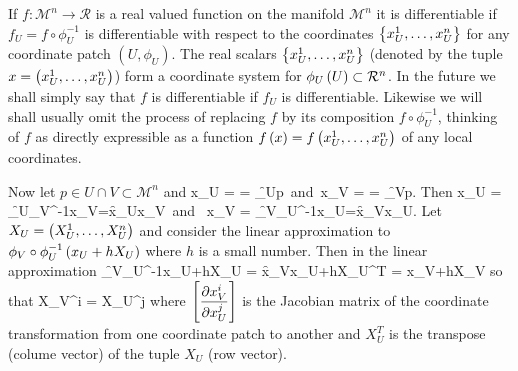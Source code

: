 If $f:\mathcal{M}^{n}\rightarrow\mathcal{R}$ is a real valued function on the manifold $\mathcal{M}^{n}$ it is differentiable if $f_{U} = f\circ\phi_{U}^{-1}$
is differentiable with respect to the coordinates $\left \{ {x^{1}_{U},\dots, x^{n}_{U}} \right \}$ for any coordinate patch $(U,\phi_{U})$.  The real scalars 
$\left \{ {x^{1}_{U},\dots, x^{n}_{U}} \right \}$
(denoted by the tuple $x=\left ( {x^{1}_{U},\dots,x^{n}_{U}} \right )$) form a coordinate system for ${\phi_{U}}\left ( {U} \right ) \subset \mathcal{R}^{n}$.  In the future we shall simply
say that $f$ is differentiable if $f_{U}$ is differentiable.  Likewise we will shall usually omit the process of replacing $f$ by its composition 
$f\circ\phi_{U}^{-1}$, thinking of $f$ as directly expressible as a function ${f}\left ( {x} \right ) = {f}\left ( {x^{1}_{U},\dots,x^{n}_{U}} \right )$ of any local coordinates.

Now let $p \in U\cap V \subset \mathcal{M}^{n}$ and 
\be
	x_{U} =  = \f{\phi_{U}}{p}\mbox{ and }x_{V} =  = \f{\phi_{V}}{p}. \nonumber
\ee
Then
\be
	x_{U} = \f{\phi_{U}\circ\phi_{V}^{-1}}{x_{V}}=\f{x_{U}}{x_{V}}\mbox{ and } x_{V} = \f{\phi_{V}\circ\phi_{U}^{-1}}{x_{U}}=\f{x_{V}}{x_{U}}. \nonumber
\ee
Let $X_{U} = \left ( {X_{U}^{1},\dots,X_{U}^{n}} \right )$ and consider the linear approximation to ${\phi_{V}\circ\phi_{U}^{-1}}\left ( {x_{U}+hX_{U}} \right )$ where $h$ is a 
small number. Then in the linear approximation
\be
	\f{\phi_{V}\circ\phi_{U}^{-1}}{x_{U}+hX_{U}} = \f{x_{V}}{x_{U}}+hX_{U}^{T} = x_{V}+hX_{V}
\ee
so that
\be\label{eq5_161}
	X_{V}^{i} = X_{U}^{j}
\ee
where $\left [ {\displaystyle\frac{\partial{x_{V}^{i}}}{\partial{x_{U}^{j}}}}\right ]$ is the Jacobian matrix of the coordinate transformation from one coordinate patch to another and $X_{U}^{T}$ is the 
transpose (colume vector) of the tuple $X_{U}$ (row vector).  
